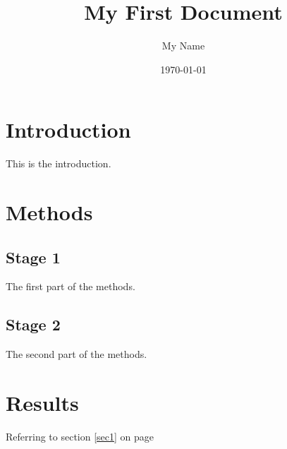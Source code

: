 \documentclass[a4paper,12pt]{article} %
\begin{document}
 

 


\title{My First Document} 

\author{My Name} 

\date{\today} 

\maketitle



\tableofcontents 

\newpage



\section{Introduction} 

This is the introduction. 

 

\section{Methods}

 

\subsection{Stage 1} 

The first part of the methods.

 

\subsection{Stage 2}

The second part of the methods. 

 

\section{Results}

Referring to section \ref{sec1} on page \pageref{sec1}
\end{document}
